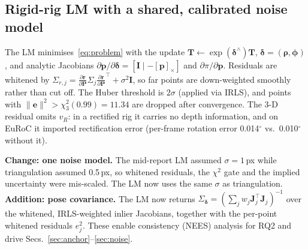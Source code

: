 \documentclass[11pt,a4paper]{article}
\newcommand{\T}{\mathbf{T}}
\begin{document}
\subsection{Rigid-rig LM with a shared, calibrated noise model}\label{sec:lm}
The LM minimises~\eqref{eq:problem} with the update $\T\leftarrow\exp(\boldsymbol\delta^\wedge)\T$, $\boldsymbol\delta = (\boldsymbol\rho,\boldsymbol\phi)$, and analytic Jacobians $\partial\mathbf p/\partial\boldsymbol\delta = [\mathbf I \mid -[\mathbf p]_\times]$ and $\partial\pi/\partial\mathbf p$. Residuals are whitened by $\Sigma_{r,j} = \tfrac{\partial\mathbf r}{\partial\mathbf P}\Sigma_j\tfrac{\partial\mathbf r}{\partial\mathbf P}^{\!\top} + \sigma^2\mathbf I$, so far points are down-weighted smoothly rather than cut off. The Huber threshold is $2\sigma$ (applied via IRLS), and points with $\|\mathbf e\|^2 > \chi^2_3(0.99) = 11.34$ are dropped after convergence. The 3-D residual omits $v_R$: in a rectified rig it carries no depth information, and on EuRoC it imported rectification error (per-frame rotation error 0.014$^\circ$ vs.\ 0.010$^\circ$ without it).

\textbf{Change: one noise model.} The mid-report LM assumed $\sigma = 1$\,px while triangulation assumed 0.5\,px, so whitened residuals, the $\chi^2$ gate and the implied uncertainty were mis-scaled. The LM now uses the same $\sigma$ as triangulation. \textbf{Addition: pose covariance.} The LM now returns $\Sigma_{\boldsymbol\delta} = (\sum_j w_j \mathbf J_j^\top\mathbf J_j)^{-1}$ over the whitened, IRLS-weighted inlier Jacobians, together with the per-point whitened residuals $e_j^2$. These enable consistency (NEES) analysis for RQ2 and drive Secs.~\ref{sec:anchor}--\ref{sec:noise}.
\end{document}
